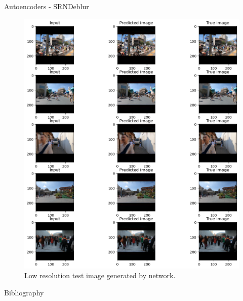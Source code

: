 \documentclass{beamer}
\begin{document}
\begin{frame}{Autoencoders - SRNDeblur\cite{SRN-DeblurNet}}
{\begin{figure}
            \includegraphics[height=0.75\textheight,keepaspectratio]{srndeblur/test.low_res.png}
            \caption{Low resolution test image generated by \textcolor{orange}{\srnreds} network. \\ 
            }
        \end{figure}
    }
\end{frame}

\begin{frame}{Bibliography}
    \tiny
    
    
\end{frame}
\end{document}
